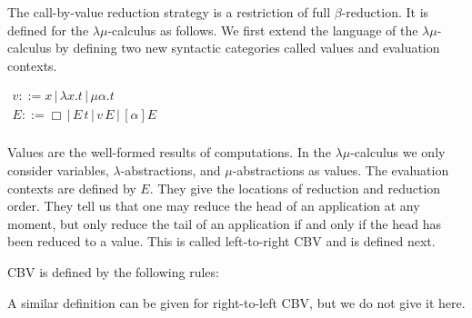 The call-by-value reduction strategy is a restriction of full
$\beta$-reduction.  It is defined for the $\lambda\mu$-calculus
as follows.  We first extend the language of the $\lambda\mu$-calculus
by defining two new syntactic categories called values
and evaluation contexts.
\begin{center}
  \begin{math}
    \begin{array}{lll}
      v ::= x\,|\,\lambda x.t\,|\, \mu \alpha.t\\
      E ::= \Box\,|\,E\,t\,|\,v\,E\,|\,[\alpha]E\\
    \end{array}
  \end{math}
\end{center}
Values are the well-formed results of computations.  In the
$\lambda\mu$-calculus we only consider variables,
$\lambda$-abstractions, and $\mu$-abstractions as values.  The
evaluation contexts are defined by $E$.  They give the locations of
reduction and reduction order.  They tell us that one may reduce the
head of an application at any moment, but only reduce the tail of an
application if and only if the head has been reduced to a value.  This
is called left-to-right CBV and is defined next.
\begin{definition}
  \label{def:lamu_cbv}
  CBV is defined by the following rules:
  \vspace{-30px}
  \begin{center}
  \end{center}
\end{definition}
\noindent
A similar definition can be given for right-to-left CBV, but we do not
give it here.  


